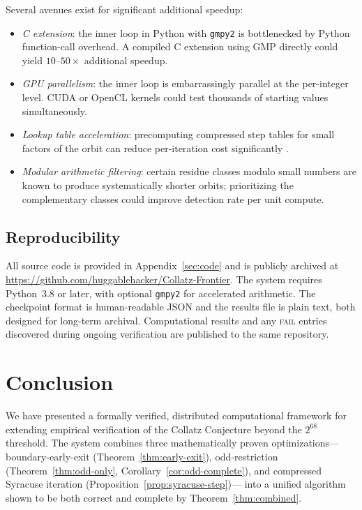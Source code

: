 \documentclass{mcom-l}
\theoremstyle{definition}
\theoremstyle{remark}
\numberwithin{equation}{section}
\begin{document}
Several avenues exist for significant additional speedup:
\begin{itemize}
  \item \emph{C extension}: the inner loop in Python with
        \texttt{gmpy2} is bottlenecked by Python function-call overhead.
        A compiled C extension using GMP directly could yield $10$--$50
        \times$ additional speedup.
  \item \emph{GPU parallelism}: the inner loop is embarrassingly
        parallel at the per-integer level.  CUDA or OpenCL kernels
        could test thousands of starting values simultaneously.
  \item \emph{Lookup table acceleration}: precomputing compressed step
        tables for small factors of the orbit can reduce per-iteration
        cost significantly \cite{Bernstein2010}.
  \item \emph{Modular arithmetic filtering}: certain residue classes
        modulo small numbers are known to produce systematically shorter
        orbits; prioritizing the complementary classes could improve
        detection rate per unit compute.
\end{itemize}

\subsection{Reproducibility}

All source code is provided in Appendix~\ref{sec:code} and is publicly
archived at
\url{https://github.com/huggablehacker/Collatz-Frontier}.
The system requires Python~3.8 or later, with optional \texttt{gmpy2}
for accelerated arithmetic.  The checkpoint format is human-readable
JSON and the results file is plain text, both designed for long-term
archival.  Computational results and any \textsc{fail} entries
discovered during ongoing verification are published to the same
repository.

\section{Conclusion}
\label{sec:conclusion}

We have presented a formally verified, distributed computational
framework for extending empirical verification of the Collatz
Conjecture beyond the $2^{68}$ threshold.  The system combines three
mathematically proven optimizations---boundary-early-exit
(Theorem~\ref{thm:early-exit}), odd-restriction
(Theorem~\ref{thm:odd-only}, Corollary~\ref{cor:odd-complete}), and
compressed Syracuse iteration (Proposition~\ref{prop:syracuse-step})---
into a unified algorithm shown to be both correct and complete by
Theorem~\ref{thm:combined}.
\end{document}
